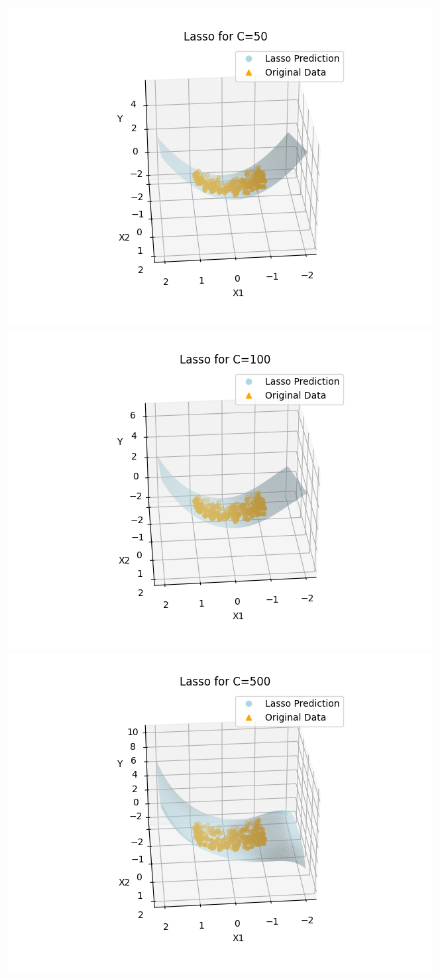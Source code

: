 \documentclass[10pt]{article}
\begin{document}
\begin{figure}[H]
\begin{center}
    \includegraphics[scale=0.4]{./images/Figure_2_50.png}
    \includegraphics[scale=0.4]{./images/Figure_2_100.png}
    \includegraphics[scale=0.4]{./images/Figure_2_500.png}

\end{center}
\end{figure}
\end{document}
